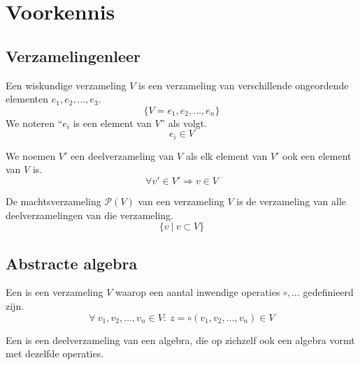 \documentclass[main.tex]{subfiles}
\begin{document}
\chapter{Voorkennis}
\label{cha:voorkennis}

\section{Verzamelingenleer}
\label{sec:verzamelingenleer}

\begin{de}
  Een wiskundige verzameling $V$ is een verzameling van verschillende ongeordende elementen $e_1,e_2,\ldots,e_3$.
  \[ \{V = e_1,e_2,\ldots,e_n\} \]
  We noteren ``$e_i$ is een element van $V$'' als volgt.
  \[ e_i \in V \]
\end{de}

\begin{de}
  We noemen $V'$ een deelverzameling van $V$ als elk element van $V'$ ook een element van $V$ is.
  \[ \forall v' \in V' \Rightarrow v \in V \]
\end{de}

\begin{de}
  De machtsverzameling $\mathcal{P}(V)$ van een verzameling $V$ is de verzameling van alle deelverzamelingen van die verzameling.
  \[ \{v\ |\ v\subset V \}\] 
\end{de}

\section{Abstracte algebra}
\label{sec:abstracte-algebra}

\begin{de}
  Een  is een verzameling $V$ waarop een aantal inwendige operaties $\circ,\ldots$ gedefinieerd zijn.
  \[ \forall\ v_1,v_2,\ldots,v_n \in V:\ z = \circ(v_1,v_2,\ldots,v_n) \in V \]
\end{de}

\begin{de}
  Een  is een deelverzameling van een algebra, die op zichzelf ook een algebra vormt met dezelfde operaties.
\end{de}
\end{document}
